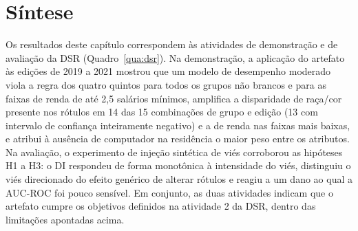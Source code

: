 \section{Síntese}
\label{sec:res_sintese}

Os resultados deste capítulo correspondem às atividades de demonstração e de avaliação da DSR (Quadro~\ref{qua:dsr}). Na demonstração, a aplicação do artefato às edições de 2019 a 2021 mostrou que um modelo de desempenho moderado viola a regra dos quatro quintos para todos os grupos não brancos e para as faixas de renda de até 2,5 salários mínimos, amplifica a disparidade de raça/cor presente nos rótulos em 14 das 15 combinações de grupo e edição (13 com intervalo de confiança inteiramente negativo) e a de renda nas faixas mais baixas, e atribui à ausência de computador na residência o maior peso entre os atributos. Na avaliação, o experimento de injeção sintética de viés corroborou as hipóteses H1 a H3: o DI respondeu de forma monotônica à intensidade do viés, distinguiu o viés direcionado do efeito genérico de alterar rótulos e reagiu a um dano ao qual a AUC-ROC foi pouco sensível. Em conjunto, as duas atividades indicam que o artefato cumpre os objetivos definidos na atividade 2 da DSR, dentro das limitações apontadas acima.

